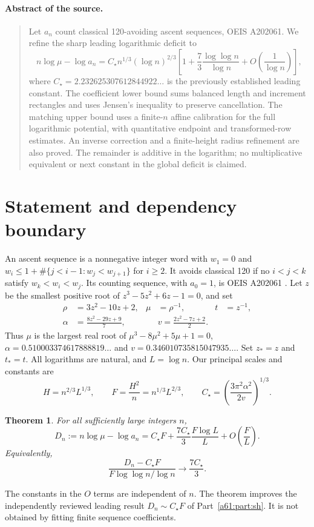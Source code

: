 \documentclass[11pt,letterpaper]{article}
\numberwithin{equation}{section}
\newtheorem{theorem}{Theorem}[section]
\theoremstyle{remark}\newtheorem{remark}[theorem]{Remark}
\newcommand{\st}{\star}
\begin{document}
\paragraph{Abstract of the source.}
\begin{quote}\small
Let $a_n$ count classical 120-avoiding ascent sequences, OEIS A202061.
We refine the sharp leading logarithmic deficit to
\[
 n\log\mu-\log a_n
 =C_\st n^{1/3}(\log n)^{2/3}
 \left[1+\frac73\frac{\log\log n}{\log n}
            +O\!\left(\frac1{\log n}\right)\right],
\]
where $C_\st=2.232625307612844922\ldots$ is the previously established leading constant.
The coefficient lower bound sums balanced length and increment rectangles and uses Jensen's inequality to preserve cancellation. The matching upper bound uses a finite-$n$ affine calibration for the full logarithmic potential, with quantitative endpoint and transformed-row estimates. An inverse correction and a finite-height radius refinement are also proved. The remainder is additive in the logarithm; no multiplicative equivalent or next constant in the global deficit is claimed.
\end{quote}

\section{Statement and dependency boundary}
An ascent sequence is a nonnegative integer word with $w_1=0$ and
$w_i\le1+\#\{j<i-1:w_j<w_{j+1}\}$ for $i\ge2$. It avoids classical 120 if no $i<j<k$ satisfy $w_k<w_i<w_j$. Its counting sequence, with $a_0=1$, is OEIS A202061 \cite{OEIS}.
Let $z$ be the smallest positive root of $z^3-5z^2+6z-1=0$, and set
\begin{align*}
 \rho&=3z^2-10z+2,& \mu&=\rho^{-1},&t&=z^{-1},\\
 \alpha&=\frac{8z^2-29z+9}{7},&&
 v=\frac{2z^2-7z+2}{2}.
\end{align*}
Thus $\mu$ is the largest real root of $\mu^3-8\mu^2+5\mu+1=0$,
$\alpha=0.510003374617888819\ldots$ and
$v=0.346010735815047935\ldots$. Set $z_*=z$ and $t_*=t$. All logarithms are natural, and $L=\log n$. Our principal scales and constants are
\begin{equation}\label{a61:o2:eq:scales}
 H=n^{2/3}L^{1/3},\qquad F=\frac{H^2}{n}=n^{1/3}L^{2/3},
 \qquad C_\st=\left(\frac{3\pi^2\alpha^2}{2v}\right)^{1/3}.
\end{equation}
\begin{theorem}\label{a61:o2:thm:main}
For all sufficiently large integers $n$,
\begin{equation}\label{a61:o2:eq:main}
 D_n:=n\log\mu-\log a_n
 =C_\st F+\frac{7C_\st}{3}\frac{F\log L}{L}
             +O\!\left(\frac FL\right).
\end{equation}
Equivalently,
\[
 \frac{D_n-C_\st F}{F\log\log n/\log n}
       \longrightarrow\frac{7C_\st}{3}.
\]
\end{theorem}
The constants in the $O$ terms are independent of $n$. The theorem improves the independently reviewed leading result $D_n\sim C_\st F$ of Part~\ref{a61:part:sh}. It is not obtained by fitting finite sequence coefficients.
\end{document}
